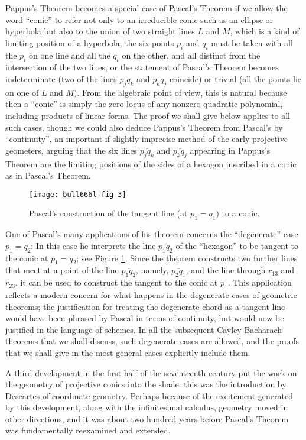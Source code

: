 \documentclass{bull-l}
\theoremstyle{pplain}
\theoremstyle{definition}
\begin{document}
Pappus's Theorem becomes a special case of Pascal's Theorem if we allow the
word ``conic'' to refer not only to an irreducible conic such as an ellipse or
hyperbola but also to the union of two straight lines $L$ and $M$, which is a
kind of limiting position of a hyperbola; the six points $p_i$ and $q_i$ must
be taken with all the $p_i$ on one line and all the $q_i$ on the other, and all
distinct from the intersection of the two lines, or the statement of Pascal's 
Theorem becomes indeterminate (two of the lines $\overline{p_jq_k}$ and $
\overline{p_kq_j}$ coincide)  or trivial (all the points lie on one of $L$ and
$M)$.  From the algebraic point of view, this is natural because then a
``conic'' is simply the zero locus of any nonzero quadratic polynomial,
including products of linear forms.  The proof we shall give below applies to
all such cases, though we could also deduce Pappus's Theorem from Pascal's by
``continuity'', an important if slightly imprecise method of the early
projective geometers, arguing that the six lines $\overline{p_jq_k}$ and $
\overline{p_kq_j}$ appearing in Pappus's Theorem are the limiting positions of
the sides of a hexagon inscribed in a conic as in Pascal's Theorem.

\begin{figure}
\texttt{[image: bull666l-fig-3]}
\caption{Pascal's construction of the tangent line (at $p_1=q_1)$ to a conic.}
\label{fig:three}
\end{figure}

One of Pascal's many applications of his theorem concerns the ``degenerate''
case $p_1=q_2$: In this case he interprets the line $\overline{p_1q_2}$ of the
``hexagon'' to be tangent to the conic at $p_1=q_2$; see Figure
\ref{fig:three}.
Since the theorem constructs two further lines that meet at a point of the line
$\overline{p_1q_2}$, namely, $\overline{p_2q_1}$, and the line through $r_{13}$
and $r_{23}$, it can be used to construct the tangent to the conic at $p_1$. 
This application reflects a modern concern for what happens in the degenerate
cases of geometric theorems; the justification for treating the degenerate
chord as a tangent line would have been phrased by Pascal in terms of
continuity, but would now be justified in the language of schemes.  In all the
subsequent Cayley-Bacharach theorems that we shall discuss, such degenerate
cases are allowed, and the proofs that we shall give in the most general
cases explicitly include them.

A third development in the first half of the seventeenth century put the work
on the geometry of projective conics into the shade: this was the introduction
by Descartes of coordinate geometry.  Perhaps because of the excitement
generated by this development, along with the infinitesimal calculus, geometry
moved in other directions, and it was about two hundred years before Pascal's 
Theorem was fundamentally reexamined and extended.
\end{document}

